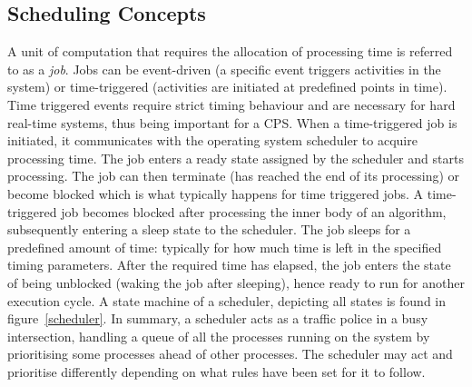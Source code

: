 \subsection{Scheduling Concepts}
A unit of computation that requires the allocation of processing time is referred to as a \textit{job}. Jobs can be event-driven (a specific event triggers activities in the system) or time-triggered (activities are initiated at predefined points in time). Time triggered events require strict timing behaviour and are necessary for hard real-time systems, thus being important for a CPS. When a time-triggered job is initiated, it communicates with the operating system scheduler to acquire processing time. The job enters a ready state assigned by the scheduler and starts processing. The job can then terminate (has reached the end of its processing) or become blocked which is what typically happens for time triggered jobs. A time-triggered job becomes blocked after processing the inner body of an algorithm, subsequently entering a sleep state to the scheduler. The job sleeps for a predefined amount of time: typically for how much time is left in the specified timing parameters. After the required time has elapsed, the job enters the state of being unblocked (waking the job after sleeping), hence ready to run for another execution cycle. A state machine of a scheduler, depicting all states is found in figure~\ref{scheduler}. In summary, a scheduler acts as a traffic police in a busy intersection, handling a queue of all the processes running on the system by prioritising some processes ahead of other processes. The scheduler may act and prioritise differently depending on what rules have been set for it to follow.\\         

